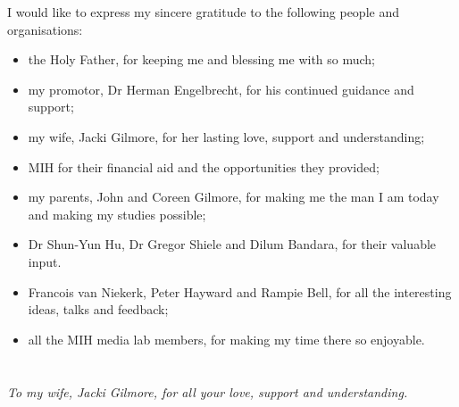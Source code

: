 I would like to express my sincere gratitude to the following people and organisations:
\begin{itemize}
  \item the Holy Father, for keeping me and blessing me with so much;
  \item my promotor, Dr Herman Engelbrecht, for his continued guidance and support;
  \item my wife, Jacki Gilmore, for her lasting love, support and understanding;
  \item MIH for their financial aid and the opportunities they provided;
  \item my parents, John and Coreen Gilmore, for making me the man I am today and making
  my studies possible;
  \item Dr Shun-Yun Hu, Dr Gregor Shiele and Dilum Bandara, for their valuable input.
  \item Francois van Niekerk, Peter Hayward and Rampie Bell, for all the interesting ideas, talks and feedback;
  \item all the MIH media lab members, for making my time there so enjoyable.
\end{itemize}


\chapter*{}%
 \vfill
 \begin{center}\itshape
    To my wife, Jacki Gilmore, for all your love, support and understanding.
 \end{center}
 \vfill
 \clearpage

\endinput
